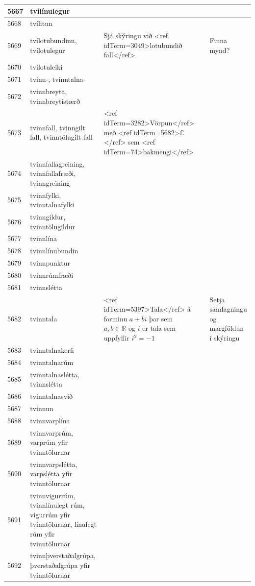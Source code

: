 \begin{longtable}{p{}|p{}|p{}|p{}|p{}}
\hline
5667 & tvílínulegur &  &  &  \\
\hline
5668 & tvílitun &  &  &  \\
\hline
5669 & tvílotubundinn, tvílotulegur & Sjá skýringu við <ref idTerm=3049>lotubundið fall</ref> &  & Finna mynd? \\
\hline
5670 & tvílotuleiki &  &  &  \\
\hline
5671 & tvinn-, tvinntalna- &  &  &  \\
\hline
5672 & tvinnbreyta, tvinnbreytistærð &  &  &  \\
\hline
5673 & tvinnfall, tvinngilt fall, tvinntölugilt fall & <ref idTerm=3282>Vörpun</ref> með <ref idTerm=5682>$\mathbb{C}$</ref> sem <ref idTerm=74>bakmengi</ref> &  & \\
\hline
5674 & tvinnfallagreining, tvinnfallafræði, tvinngreining &  &  &  \\
\hline
5675 & tvinnfylki, tvinntalnafylki &  &  &  \\
\hline
5676 & tvinngildur, tvinntölugildur &  &  &  \\
\hline
5677 & tvinnlína &  &  &  \\
\hline
5678 & tvinnlínubundin &  &  &  \\
\hline
5679 & tvinnpunktur &  &  &  \\
\hline
5680 & tvinnrúmfræði &  &  &  \\
\hline
5681 & tvinnslétta &  &  &  \\
\hline
5682 & tvinntala & <ref idTerm=5397>Tala</ref> á forminu $a+bi$ þar sem $a,b\in\mathbb{R}$ og $i$ er tala sem uppfyllir $i^2=-1$ &  & Setja samlagningu og margföldun í skýringu \\
\hline
5683 & tvinntalnakerfi &  &  &  \\
\hline
5684 & tvinntalnarúm &  &  &  \\
\hline
5685 & tvinntalnaslétta, tvinnslétta &  &  &  \\
\hline
5686 & tvinntalnasvið &  &  &  \\
\hline
5687 & tvinnun &  &  &  \\
\hline
5688 & tvinnvarplína &  &  &  \\
\hline
5689 & tvinnvarprúm, varprúm yfir tvinntölurnar &  &  &  \\
\hline
5690 & tvinnvarpslétta, varpslétta yfir tvinntölurnar &  &  &  \\
\hline
5691 & tvinnvigurrúm, tvinnlínulegt rúm, vigurrúm yfir tvinntölurnar, línulegt rúm yfir tvinntölurnar &  &  &  \\
\hline
5692 & tvinnþverstaðalgrúpa, þverstaðalgrúpa yfir tvinntölurnar &  &  &  \\

\end{longtable}
